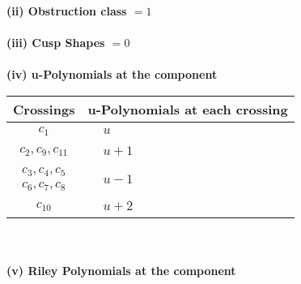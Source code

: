\documentclass[1p]{elsarticle_modified}
\theoremstyle{definition}
\begin{document}
\flushleft \textbf{(ii) Obstruction class $= 1$}\\~\\
\flushleft \textbf{(iii) Cusp Shapes $= 0$}\\~\\
\newpage\renewcommand{\arraystretch}{1}
\flushleft \textbf{(iv) u-Polynomials at the component}\newline \\
\begin{tabular}{m{50pt}|m{274pt}}
Crossings & \hspace{64pt}u-Polynomials at each crossing \\
\hline $$\begin{aligned}c_{1}\end{aligned}$$&$\begin{aligned}
&u
\end{aligned}$\\
\hline $$\begin{aligned}c_{2},c_{9},c_{11}\end{aligned}$$&$\begin{aligned}
&u+1
\end{aligned}$\\
\hline $$\begin{aligned}c_{3},c_{4},c_{5}\\c_{6},c_{7},c_{8}\end{aligned}$$&$\begin{aligned}
&u-1
\end{aligned}$\\
\hline $$\begin{aligned}c_{10}\end{aligned}$$&$\begin{aligned}
&u+2
\end{aligned}$\\
\hline
\end{tabular}\\~\\
\newpage\renewcommand{\arraystretch}{1}
\flushleft \textbf{(v) Riley Polynomials at the component}\newline \\
\end{document}
